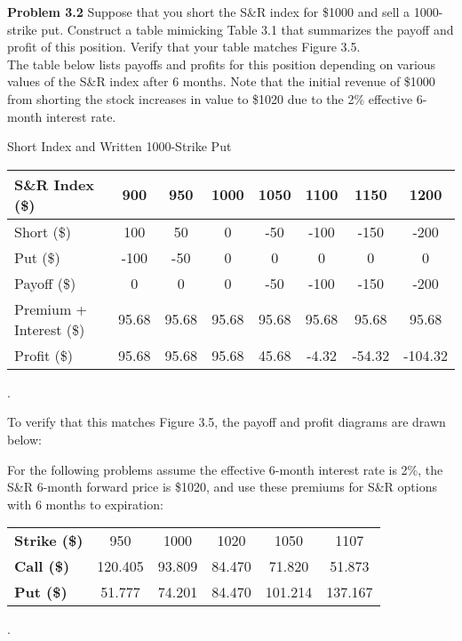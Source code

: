 \documentclass[12pt]{article}
\newcommand{\problem}[1]{\bigskip \noindent \textbf{Problem #1}}
\theoremstyle{plain}
\begin{document}
\problem{3.2} Suppose that you short the S\&R index for \$1000 and sell a 1000-strike put. Construct a table mimicking Table 3.1 that summarizes the payoff and profit of this position. Verify that your table matches Figure 3.5.\\

The table below lists payoffs and profits for this position depending on various values of the S\&R index after 6 months. Note that the initial revenue of \$1000 from shorting the stock increases in value to \$1020 due to the 2\% effective 6-month interest rate.

\begin{center}
Short Index and Written 1000-Strike Put
\begin{tabular}{l||ccccccc}
S\&R Index (\$) & 900 & 950 & 1000 & 1050 & 1100 & 1150 & 1200 \\ \hline \hline
Short (\$) & 100 & 50 & 0 & -50 & -100 & -150 & -200 \\
Put (\$) & -100 & -50 & 0 & 0 & 0 & 0 & 0 \\
Payoff (\$) & 0 & 0 & 0 & -50 & -100 & -150 & -200 \\
Premium + Interest (\$) & 95.68 & 95.68 & 95.68 & 95.68 & 95.68 & 95.68 & 95.68 \\
Profit (\$) & 95.68 & 95.68 & 95.68 & 45.68 & -4.32 & -54.32 & -104.32
\end{tabular}.
\end{center}
To verify that this matches Figure 3.5, the payoff and profit diagrams are drawn below:
\begin{center}
\end{center}

\bigskip
For the following problems assume the effective 6-month interest rate is 2\%, the S\&R 6-month forward price is \$1020, and use these premiums for S\&R options with 6 months to expiration:
\begin{center}
\begin{tabular}{l||ccccc}
\textbf{Strike (\$)} & 950 & 1000 & 1020 & 1050 & 1107 \\
\textbf{Call (\$)} & 120.405 & 93.809 & 84.470 & 71.820 & 51.873\\
\textbf{Put (\$)} & 51.777 & 74.201 & 84.470 & 101.214 & 137.167
\end{tabular}.
\end{center}
\end{document}
